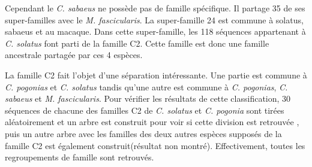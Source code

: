 \documentclass[12pt,a4paper]{article}
\begin{document}
				Cependant le \textit{C. sabaeus} ne possède pas de famille spécifique. Il partage 35 de ses super-familles avec le \textit{M. fascicularis}. La super-famille 24 est commune à solatus, sabaeus et au macaque. Dans cette super-famille, les 118 séquences appartenant à \textit{C. solatus} font parti de la famille C2. Cette famille est donc une famille ancestrale partagée par ces 4 espèces. 
				
				La famille C2 fait l'objet d'une séparation intéressante. Une partie est commune à \textit{C. pogonias} et \textit{C. solatus} tandis qu'une autre est commune à \textit{C. pogonias}, \textit{C. sabaeus} et \textit{M. fascicularis}. Pour vérifier les résultats de cette classification, 30 séquences de chacune des familles C2 de \textit{C. solatus} et \textit{C. pogonia} sont tirées aléatoirement et un arbre est construit pour voir si cette division est retrouvée , puis un autre arbre avec les familles des deux autres espèces supposés de la famille C2 est également construit(résultat non montré). Effectivement, toutes les regroupements de famille sont retrouvés.
							
\end{document}
